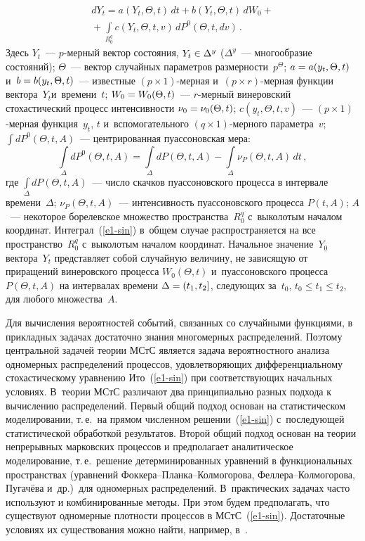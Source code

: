 \begin{multicols}{2}
\noindent
    \begin{multline}
    dY_t= a (Y_t,\Theta,t) \,dt + b(Y_t,\Theta,t)\, d W_0 +{}\\
    {}+
    \int\limits_{R_0^q} c(Y_t,\Theta,t,v)\, dP^0 (\Theta, t,
    dv)\,.\label{e1-sin}
\end{multline}
Здесь $Y_t$~--- $p$-мер\-ный вектор состояния, $Y_t\hm\in \Delta^y$
($\Delta^y$~--- многообразие состояний); $\Theta$~--- вектор  случайных
параметров размерности~$p^\Theta$;\linebreak
$a\hm=a (y_t,\Theta,t)$ и~$b\hm= b(y_t,\Theta,t)$~---
известные $(p\times 1)$-мер\-ная и~$(p\times r)$-мер\-ная
функции вектора~$Y_t$\linebreak и~времени~$t$; $W_0\hm= W_0(\Theta, t)$~---
$r$-мер\-ный винеровский стохастический процесс интенсивности $\nu_0\hm=
\nu_0(\Theta,t)$; $c(y_t,\Theta, t,v)$~--- $(p\times 1)$-мер\-ная функция~$y_t$,
$t$ и~вспомогательного
$(q\times 1)$-мер\-но\-го параметра~$v$; $\int\limits d P^0 (\Theta, t,A)$~---
центрированная пуассоновская мера:
    $$
    \int\limits_{\Delta} d P^0 (\Theta, t,A)=
    \int\limits_{\Delta} d P (\Theta, t,A)-
    \int\limits_{\Delta} \nu_P (\Theta, t,A) \,dt\,,
    $$
где $\int\limits_{\Delta} d P (\Theta, t,A)$~--- число скачков пуассоновского
процесса в интервале времени~$\Delta$; $\nu_P (\Theta, t,A)$~--- интенсивность
пуассоновского процесса $P(t,A)$;
$A$~--- некоторое борелевское множество пространства~$R^q_0$ с~выколотым началом координат.
Интеграл~(\ref{e1-sin}) в~общем случае распространяется на все пространство~$R_0^q$
с~выколотым началом координат.
Начальное значение~$Y_0$ вектора~$Y_t$ представляет
собой случайную величину, не зависящую от приращений винеровского
процесса $W_0(\Theta, t)$ и~пуассоновского процесса $P(\Theta, t,A)$ на интервалах
времени $\Delta\hm= (t_1, t_2]$, следующих за~$t_0$, $t_0\le t_1\le t_2$,
для любого множества~$A$.


Для вычисления вероятностей событий,
связанных со случайными функциями, в прикладных задачах достаточно
знания многомерных распределений. Поэтому центральной
задачей теории МСтС
является задача вероятностного анализа одномерных
распределений процессов, удовлетворяющих дифференциальному стохастическому
уравнению Ито~(\ref{e1-sin}) при
соответствующих начальных условиях.
В~теории МСтС различают два принципиально разных подхода
к вычислению распределений. Первый общий подход основан на
статистическом моделировании, т.\,е.\ на прямом численном решении~(\ref{e1-sin})
с~последующей статистической обработкой результатов. Второй общий
подход основан на теории непрерывных марковских процессов и
предполагает аналитическое моделирование, т.\,е.\ решение
детерминированных уравнений в функциональных пространствах
(уравнений Фок\-ке\-ра--План\-ка--Кол\-мо\-го\-ро\-ва, Фел\-ле\-ра--Кол\-мо\-го\-ро\-ва,
Пугачёва и~др.)\ для одномерных распределений.
В~практических задачах часто используют и комбинированные методы. При
этом будем предполагать, что существуют  одномерные
плотности процессов в МСтС~(\ref{e1-sin}). Достаточные условиях их
существования можно найти, например, в~\cite{13-sin}.



\end{multicols}
